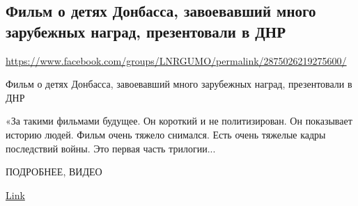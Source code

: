  
 
\subsection{Фильм о детях Донбасса, завоевавший много зарубежных наград, презентовали в ДНР}
\url{https://www.facebook.com/groups/LNRGUMO/permalink/2875026219275600/}


Фильм о детях Донбасса, завоевавший много зарубежных наград, презентовали в ДНР

«За такими фильмами будущее. Он короткий и не политизирован. Он показывает
историю людей. Фильм очень тяжело снимался. Есть очень тяжелые кадры
последствий войны. Это первая часть трилогии...

ПОДРОБНЕЕ, ВИДЕО

\href{https://l.facebook.com/l.php?u=https%
}{Link}
  

